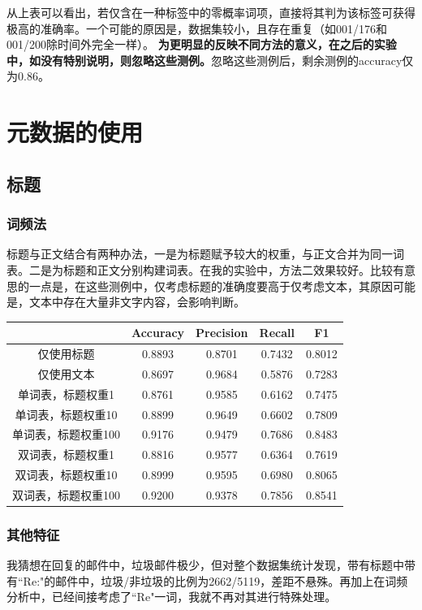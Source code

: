 \documentclass{article}
\begin{document}
从上表可以看出，若仅含在一种标签中的零概率词项，直接将其判为该标签可获得极高的准确率。一个可能的原因是，数据集较小，且存在重复（如001/176和001/200除时间外完全一样）。
\textbf{为更明显的反映不同方法的意义，在之后的实验中，如没有特别说明，则忽略这些测例。}忽略这些测例后，剩余测例的accuracy仅为0.86。


\section{元数据的使用}
\subsection{标题}
\subsubsection{词频法}
标题与正文结合有两种办法，一是为标题赋予较大的权重，与正文合并为同一词表。二是为标题和正文分别构建词表。在我的实验中，方法二效果较好。比较有意思的一点是，在这些测例中，仅考虑标题的准确度要高于仅考虑文本，其原因可能是，文本中存在大量非文字内容，会影响判断。
\begin{table}[h]
\center
\label{tab:meta-title}
\begin{tabular}[]{|c|c|c|c|c|}
\hline
& Accuracy & Precision & Recall & F1 \\ \hline
仅使用标题 & 0.8893 & 0.8701 & 0.7432 & 0.8012 \\ \hline
仅使用文本 & 0.8697 & 0.9684 & 0.5876 & 0.7283 \\ \hline
单词表，标题权重1 & 0.8761 & 0.9585 & 0.6162 & 0.7475 \\ \hline
单词表，标题权重10 & 0.8899 & 0.9649 & 0.6602 & 0.7809 \\ \hline
单词表，标题权重100 & 0.9176 & 0.9479 & 0.7686 & 0.8483 \\ \hline
双词表，标题权重1 & 0.8816 & 0.9577 & 0.6364 & 0.7619 \\ \hline
双词表，标题权重10 & 0.8999 & 0.9595 & 0.6980 & 0.8065 \\ \hline
双词表，标题权重100 & 0.9200 & 0.9378 & 0.7856 & 0.8541 \\ \hline
\end{tabular}
\end{table}

\subsubsection{其他特征}
我猜想在回复的邮件中，垃圾邮件极少，但对整个数据集统计发现，带有标题中带有``Re:"的邮件中，垃圾/非垃圾的比例为2662/5119，差距不悬殊。再加上在词频分析中，已经间接考虑了``Re"一词，我就不再对其进行特殊处理。
\end{document}
